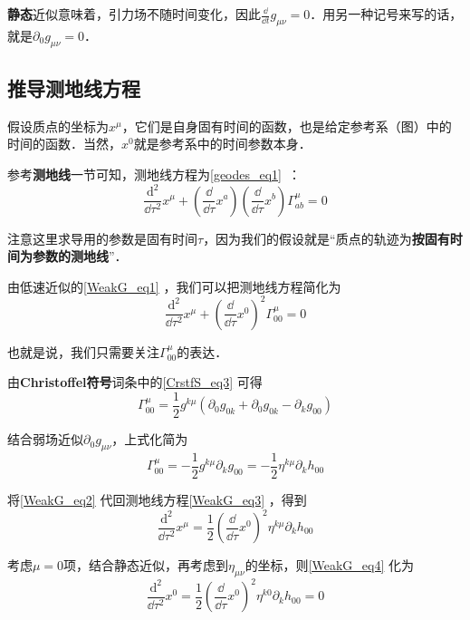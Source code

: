 \textbf{静态}近似意味着，引力场不随时间变化，因此$\frac{\dd}{\dd t}g_{\mu\nu}=0$．用另一种记号来写的话，就是$\partial_0g_{\mu\nu}=0$．

\subsection{推导测地线方程}

假设质点的坐标为$x^\mu$，它们是自身固有时间的函数，也是给定参考系（图）中的时间的函数．当然，$x^0$就是参考系中的时间参数本身．

参考\textbf{测地线}一节可知，测地线方程为\autoref{geodes_eq1}~：
\begin{equation}
\frac{\mathrm{d}^2}{\dd\tau^2}x^\mu+(\frac{\dd}{\dd\tau}x^a)(\frac{\dd}{\dd\tau}x^b)\Gamma^\mu_{ab}=0
\end{equation}

注意这里求导用的参数是固有时间$\tau$，因为我们的假设就是“质点的轨迹为\textbf{按固有时间为参数的测地线}”．

由低速近似的\autoref{WeakG_eq1} ，我们可以把测地线方程简化为
\begin{equation}\label{WeakG_eq3}
\frac{\mathrm{d}^2}{\dd\tau^2}x^\mu+(\frac{\dd}{\dd\tau}x^0)^2\Gamma^\mu_{00}=0
\end{equation}

也就是说，我们只需要关注$\Gamma^\mu_{00}$的表达．

由\textbf{Christoffel符号}词条中的\autoref{CrstfS_eq3} 可得
\begin{equation}
\Gamma^\mu_{00}=\frac{1}{2}g^{k\mu}(\partial_0g_{0k}+\partial_0g_{0k}-\partial_{k}g_{00})
\end{equation}

结合弱场近似$\partial_0g_{\mu\nu}$，上式化简为
\begin{equation}\label{WeakG_eq2}
\Gamma^\mu_{00}=-\frac{1}{2}g^{k\mu}\partial_{k}g_{00}=-\frac{1}{2}\eta^{k\mu}\partial_{k}h_{00}
\end{equation}

将\autoref{WeakG_eq2} 代回测地线方程\autoref{WeakG_eq3} ，得到
\begin{equation}\label{WeakG_eq4}
\frac{\mathrm{d}^2}{\dd\tau^2}x^\mu=\frac{1}{2}(\frac{\dd}{\dd\tau}x^0)^2\eta^{k\mu}\partial_{k}h_{00}
\end{equation}

考虑$\mu=0$项，结合静态近似，再考虑到$\eta_{\mu\nu}$的坐标，则\autoref{WeakG_eq4} 化为
\begin{equation}
\frac{\mathrm{d}^2}{\dd\tau^2}x^0=\frac{1}{2}(\frac{\dd}{\dd\tau}x^0)^2\eta^{k0}\partial_{k}h_{00}=0
\end{equation}

